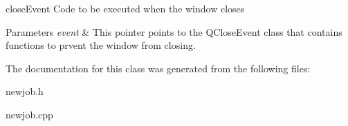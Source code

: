 close\+Event Code to be executed when the window closes 


\begin{DoxyParams}{Parameters}
{\em event} & This pointer points to the Q\+Close\+Event class that contains functions to prvent the window from closing. \\
\hline
\end{DoxyParams}


The documentation for this class was generated from the following files\+:\begin{DoxyCompactItemize}
\item 
newjob.\+h\item 
newjob.\+cpp\end{DoxyCompactItemize}

